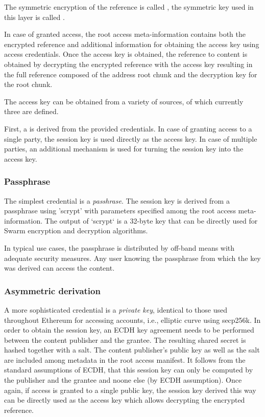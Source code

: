 The symmetric encryption of the reference is called , the symmetric key used in this layer is called
.

In case of granted access, the root access meta-information contains both the encrypted reference and additional information for obtaining the access key using access credentials. Once the access key is obtained, the reference to content is obtained by decrypting the encrypted reference with the access key resulting in the full reference composed of the address root chunk and the decryption key for the root chunk. 

The access key can be obtained from a variety of sources, of which currently three are defined.

First, a  is derived from the provided credentials. In case of granting access to a single party, the session key is used directly as the access key. In case of multiple parties, an additional mechanism is used for turning the session key into the access key.

\subsubsection{Passphrase}
The simplest credential is a \emph{passhrase}. The session key is derived from a passphrase using 'scrypt' with parameters specified among the root access meta-information. The output of `scrypt` is a 32-byte key that can be directly used for Swarm encryption and decryption algorithms.

In typical use cases, the passphrase is distributed by off-band means with adequate security measures. Any user knowing the passphrase from which the key was derived can access the content.

\subsubsection{Asymmetric derivation}

A more sophisticated credential is a \emph{private key}, identical to those used throughout Ethereum for accessing accounts, i.e., elliptic curve using secp256k. In order to obtain the session key, an ECDH key agreement needs to be performed between the content publisher and the grantee. The resulting shared secret is hashed together with a salt. The content publisher's public key as well as the salt are included among metadata in the root access manifest. It follows from the standard assumptions of ECDH, that this session key can only be computed by the publisher and the grantee and noone else (by ECDH assumption). 
Once again, if access is granted to a single public key, the session key derived this way can be directly used as the access key which allows decrypting the encrypted reference. 

